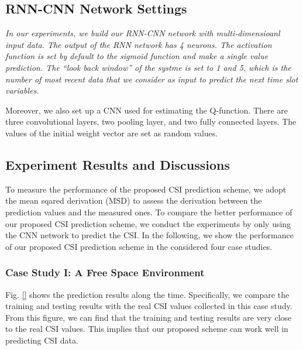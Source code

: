 \documentclass[10pt,journal,cspaper,compsoc]{IEEEtran}
\begin{document}
\subsection{RNN-CNN Network Settings}
\label{subsubsec:case1-rnncnn}

\textit{In our experiments, we build our RNN-CNN network with multi-dimensioanl input data. The output of the RNN network has 4 neurons. The activation function is set by default to the sigmoid function and make a single value prediction. The ``look back window'' of the systme is set to 1 and 5, which is the number of most recent data that we consider as input to predict the next time slot variables.}

Moreover, we also set up a CNN used for estimating the Q-function. There are three convolutional layers, two pooling layer, and two fully connected layers. The values of the initial weight vector are set as random values. 

\subsection{Experiment Results and Discussions}
\label{subsec:case1}

To measure the performance of the proposed CSI prediction scheme, we adopt the mean sqared derivation (MSD) to assess the derivation between the prediction values and the measured ones. To compare the better performance of our proposed CSI prediction scheme, we conduct the experiments by only using the CNN network to predict the CSI. In the following, we show the performance of our proposed CSI prediction scheme in the considered four case studies.


\subsubsection{Case Study I: A Free Space Environment}
\label{subsubsec:case1}

Fig. \ref{} shows the prediction results along the time. Specifically, we compare the training and testing results with the real CSI values collected in this case study. From this figure, we can find that the training and testing results are very close to the real CSI values. This implies that our proposed scheme can work well in predicting CSI data.
\end{document}
